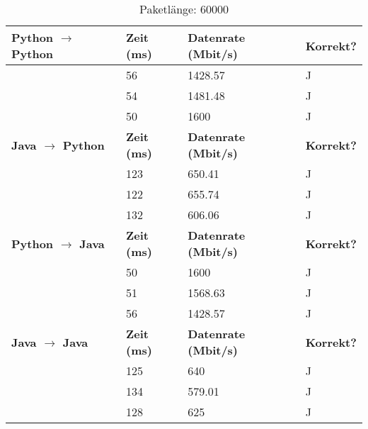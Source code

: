 \documentclass{article}
\begin{document}
\begin{table}[]
\caption{Paketlänge: 60000}
\label{tab:my-table}
\begin{tabular}{|l|l|l|l|}
\hline
\textbf{Python $\rightarrow$ Python} & \textbf{Zeit (ms)} & \textbf{Datenrate (Mbit/s)} & \textbf{Korrekt?} \\ \hline
                            & 56       & 1428.57         & J        \\ \cline{2-4} 
                            & 54       & 1481.48         & J        \\ \cline{2-4} 
                            & 50       & 1600            & J        \\ \hline
\textbf{Java $\rightarrow$ Python}   & \textbf{Zeit (ms)} & \textbf{Datenrate (Mbit/s)} & \textbf{Korrekt?} \\ \hline
                            & 123      & 650.41          & J        \\ \cline{2-4} 
                            & 122      & 655.74          & J        \\ \cline{2-4} 
                            & 132      & 606.06          & J        \\ \hline
\textbf{Python $\rightarrow$ Java}  & \textbf{Zeit (ms)} & \textbf{Datenrate (Mbit/s)} & \textbf{Korrekt?} \\ \hline
                            & 50       & 1600            & J        \\ \cline{2-4} 
                            & 51       & 1568.63         & J        \\ \cline{2-4} 
                            & 56       & 1428.57         & J        \\ \hline
\textbf{Java $\rightarrow$ Java}   & \textbf{Zeit (ms)} & \textbf{Datenrate (Mbit/s)} & \textbf{Korrekt?} \\ \hline
                            & 125      & 640             & J        \\ \cline{2-4} 
                            & 134      & 579.01          & J        \\ \cline{2-4} 
                            & 128      & 625             & J        \\ \hline
\end{tabular}
\end{table}
\end{document}
